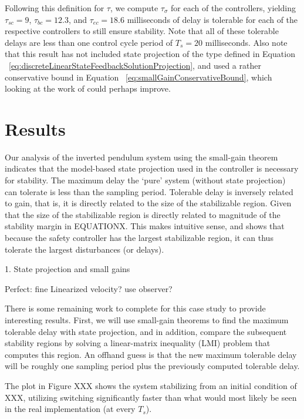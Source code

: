 \documentclass[conference]{IEEEtran}
\begin{document}
Following this definition for $\tau$, we compute $\tau_{\sigma}$ for each of the controllers, yielding $\tau_{sc}=9$, $\tau_{bc}=12.3$, and $\tau_{ec}=18.6$ milliseconds of delay is tolerable for each of the respective controllers to still ensure stability.  Note that all of these tolerable delays are less than one control cycle period of $T_s=20$ milliseconds.  Also note that this result has not included state projection of the type defined in Equation ~\ref{eq:discreteLinearStateFeedbackSolutionProjection}, and used a rather conservative bound in Equation ~\ref{eq:smallGainConservativeBound}, which looking at the work of \cite{Fridman2008} could perhaps improve.

\section{Results}
Our analysis of the inverted pendulum system using the small-gain theorem indicates that the model-based state projection used in the controller is necessary for stability.  The maximum delay the `pure' system (without state projection) can tolerate is less than the sampling period.  Tolerable delay is inversely related to gain, that is, it is directly related to the size of the stabilizable region.  Given that the size of the stabilizable region is directly related to magnitude of the stability margin in EQUATIONX.  This makes intuitive sense, and shows that because the safety controller has the largest stabilizable region, it can thus tolerate the largest disturbances (or delays).

1. State projection and small gains

Perfect: fine
Linearized velocity? use observer?

There is some remaining work to complete for this case study to provide interesting results.  First, we will use small-gain theorems to find the maximum tolerable delay with state projection, and in addition, compare the subsequent stability regions by solving a linear-matrix inequality (LMI) problem that computes this region.  An offhand guess is that the new maximum tolerable delay will be roughly one sampling period plus the previously computed tolerable delay.

The plot in Figure XXX shows the system stabilizing from an initial condition of XXX, utilizing switching significantly faster than what would most likely be seen in the real implementation (at every $T_s$).
\end{document}
